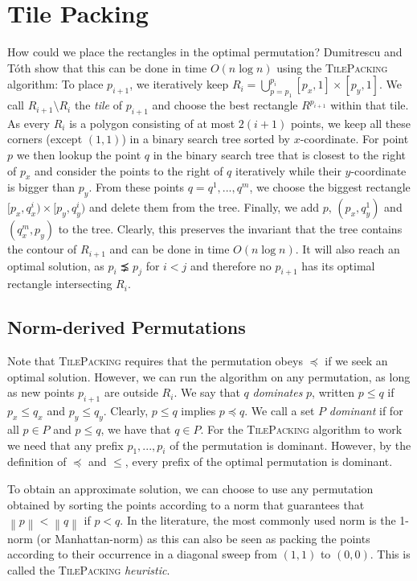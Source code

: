 \documentclass[11pt, a4paper, twocolumn]{article}
\newcommand{\norm}[1]{\left\lVert#1\right\rVert}
\begin{document}
\section{Tile Packing}
\label{tiled}

How could we place the rectangles in the optimal permutation? Dumitrescu and Tóth \cite{dumitrescu2015packing}
show that this can be done in time $O(n\log n)$ using the \textsc{TilePacking} algorithm:
To place $p_{i+1}$, we iteratively keep $R_i = \bigcup_{p=p_1}^{p_i} [p_x, 1] \times [p_y, 1]$.
We call $R_{i+1} \setminus R_i$ the \textit{tile} of $p_{i+1}$ and choose the best rectangle $R^{p_{i+1}}$ within
that tile. As every $R_i$ is a polygon consisting of at most $2(i + 1)$ points, we keep
all these corners (except $(1,1)$) in a binary search tree sorted by $x$-coordinate.
For point $p$ we then lookup the point $q$ in the binary search tree that is
closest to the right of $p_x$ and consider the points to the right of $q$
iteratively while their $y$-coordinate is bigger than $p_y$. From these points
$q = q^1, ..., q^m$, we choose the biggest rectangle $[p_x, q^i_x) \times [p_y, q^i_y)$
and delete them from the tree. Finally, we add $p$, $(p_x, q^1_y)$ and $(q^m_x, p_y)$ to the tree.
Clearly, this preserves the invariant that the tree contains the contour of $R_{i+1}$
and can be done in time $O(n \log n)$. It will also reach an optimal solution, as $p_i \precneq p_j$
for $i < j$ and therefore no $p_{i+1}$ has its optimal rectangle intersecting $R_i$.

\subsection{Norm-derived Permutations}

Note that \textsc{TilePacking} requires that the permutation obeys $\preceq$ if we seek an optimal solution.
However, we can run the algorithm on any permutation, as long as new points $p_{i+1}$ are
outside $R_i$. We say that $q$ \textit{dominates} $p$, written $p \leq q$ if
$p_x \leq q_x$ and $p_y \leq q_y$. Clearly, $p \leq q$ implies $p \preceq q$.
We call a set $P$ \textit{dominant} if for all $p \in P$ and $p \leq q$,
we have that $q \in P$. For the \textsc{TilePacking} algorithm to work we need that any
prefix $p_1, ..., p_i$ of the permutation is dominant. However, by the definition of $\preceq$ and
$\leq$, every prefix of the optimal permutation is dominant.

To obtain an approximate solution, we can choose to use any permutation obtained
by sorting the points according to a norm that guarantees that $\norm{p} < \norm{q}$ if $p < q$.
In the literature, the most commonly used norm is the 1-norm
(or Manhattan-norm) as this can also be seen as packing the points according to
their occurrence in a diagonal sweep from $(1,1)$ to $(0,0)$.
This is called the \textsc{TilePacking} \textit{heuristic}.
\end{document}
